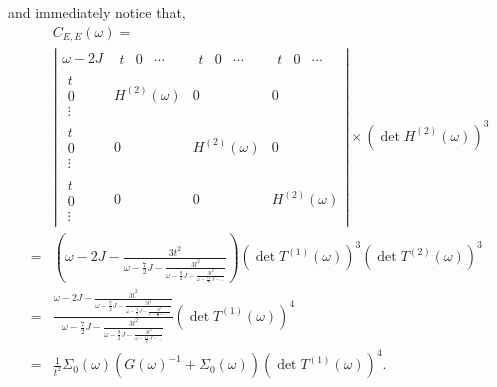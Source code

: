 \documentclass{article}
\begin{document}
and immediately notice that,
\begin{equation}
\begin{split}
    &C_{E,E}(\omega) = \\ 
    &\left\vert
    \begin{array}{c|c|c|c}
        \omega - 2J &
            \begin{array}{ccc} t & 0 & \cdots \end{array} &
            \begin{array}{ccc} t & 0 & \cdots \end{array} &
            \begin{array}{ccc} t & 0 & \cdots \end{array} \\
        \hline
        \begin{array}{c} t \\ 0 \\ \vdots \end{array} & 
            H^{(2)}(\omega) & 0 & 0 \\
        \hline
        \begin{array}{c} t \\ 0 \\ \vdots \end{array} & 
            0 & H^{(2)}(\omega) & 0 \\
        \hline
        \begin{array}{c} t \\ 0 \\ \vdots \end{array} & 
            0 & 0 & H^{(2)}(\omega)
    \end{array}
    \right\vert 
    \times \left(\det H^{(2)}(\omega)\right)^3 \\
    =  &\left(\omega - 2J - \frac{3t^2}{
            \omega - \frac{7}{2}J - \frac{3t^2}{
                \omega - \frac{9}{2}J - \frac{3t^2}{
                    \omega - \frac{11}{2}J - \hdots
                }
            }
        }\right) 
    \left(\det T^{(1)}(\omega) \right)^3 \left(\det T^{(2)}(\omega)\right)^3 \\
    =  &\frac{
            \omega - 2J - \frac{3t^2}{
                \omega - \frac{7}{2}J - \frac{3t^2}{
                    \omega - \frac{9}{2}J - \frac{3t^2}{
                        \omega - \frac{11}{2}J - \hdots
                    }
                }
            }
        }{
            \omega - \frac{7}{2}J - \frac{3t^2}{
                \omega - \frac{9}{2}J - \frac{3t^2}{
                    \omega - \frac{11}{2}J - \hdots
                }
            }        
        }
    \left(\det T^{(1)}(\omega) \right)^4 \\
    =  &\frac{1}{t^2}
        \Sigma_0(\omega)\left(G(\omega)^{-1} + \Sigma_0(\omega)\right) 
        \left(\det T^{(1)}(\omega) \right)^4.
\end{split}
\end{equation}    
\end{document}
